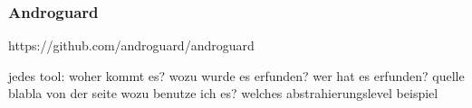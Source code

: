 \subsubsection{Androguard}\label{subsection:tools-java-androguard}
https://github.com/androguard/androguard

jedes tool:\newline
woher kommt es?\newline
wozu wurde es erfunden?\newline
wer hat es erfunden? quelle\newline
blabla von der seite\newline
wozu benutze ich es?\newline
welches abstrahierungslevel\newline
beispiel\newline
